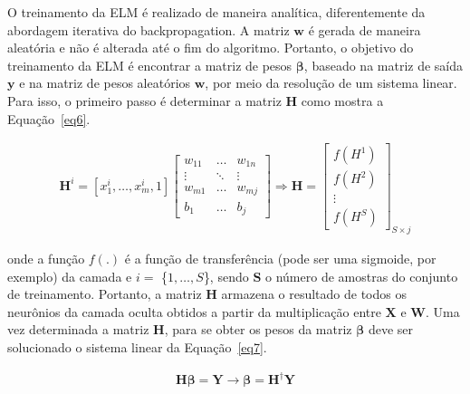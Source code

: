 O treinamento da ELM é realizado de maneira analítica, diferentemente da abordagem iterativa do backpropagation. A matriz \(\mathbf{w}\) é gerada de maneira aleatória e não é alterada até o fim do algoritmo. Portanto, o objetivo do treinamento da ELM é encontrar a matriz de pesos \(\boldsymbol{\beta}\), baseado na matriz de saída \(\mathbf{y}\) e na matriz de pesos aleatórios \(\mathbf{w}\), por meio da resolução de um sistema linear. Para isso, o primeiro passo é determinar a matriz \(\mathbf{H}\) como mostra a Equação~\eqref{eq6}.

\begin{equation} \label{eq6}
\begin{split}
\mathbf{H}^i = [x_{1}^{i}, \dots , x_{m}^{i},1]                             \begin{bmatrix}
                w_{11}      & \dots     & w_{1n} \\
                \vdots      & \ddots    & \vdots \\
                w_{m1}      & \dots     & w_{mj} \\
                b_{1}      & \dots     & b_{j}
            \end{bmatrix} \Rightarrow \mathbf{H} = \begin{bmatrix}
                f(H^1) \\
                f(H^2) \\
                \vdots \\
                f(H^S)
            \end{bmatrix}_{S \times j}
\end{split}
\end{equation}

onde a função \(f(.)\) é a função de transferência (pode ser uma sigmoide, por exemplo) da camada e \(i =\) \{\(1, \dots , S\)\}, sendo \(\mathbf{S}\) o número de amostras do conjunto de treinamento. Portanto, a matriz \(\mathbf{H}\) armazena o resultado de todos os neurônios da camada oculta obtidos a partir da multiplicação entre \(\mathbf{X}\) e \(\mathbf{W}\). Uma vez determinada a matriz \(\mathbf{H}\), para se obter os pesos da matriz \(\boldsymbol{\beta}\) deve ser solucionado o sistema linear da Equação~\eqref{eq7}.

\begin{equation} \label{eq7}
\begin{split}
\mathbf{H} \boldsymbol{\beta} = \mathbf{Y} \rightarrow \boldsymbol{\beta} = \mathbf{H}^\dagger \mathbf{Y} 
\end{split}
\end{equation}

